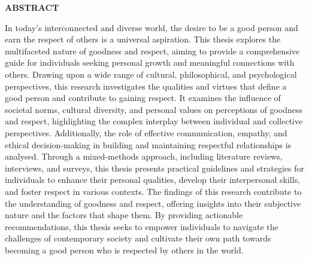 \providecommand\phantomsection{} \phantomsection
\renewcommand{\headrulewidth}{0pt}
\begin{center}
\providecommand\pdfbookmark[3][]{} \pdfbookmark[0]{Abstract}{bm:Abstract}
\vspace*{1in}
\textbf{ABSTRACT}\\[2\baselineskip]
\end{center}


In today's interconnected and diverse world, the desire to be a good person and earn the respect of others is a universal aspiration. This thesis explores the multifaceted nature of goodness and respect, aiming to provide a comprehensive guide for individuals seeking personal growth and meaningful connections with others. Drawing upon a wide range of cultural, philosophical, and psychological perspectives, this research investigates the qualities and virtues that define a good person and contribute to gaining respect. It examines the influence of societal norms, cultural diversity, and personal values on perceptions of goodness and respect, highlighting the complex interplay between individual and collective perspectives. Additionally, the role of effective communication, empathy, and ethical decision-making in building and maintaining respectful relationships is analysed. Through a mixed-methods approach, including literature reviews, interviews, and surveys, this thesis presents practical guidelines and strategies for individuals to enhance their personal qualities, develop their interpersonal skills, and foster respect in various contexts. The findings of this research contribute to the understanding of goodness and respect, offering insights into their subjective nature and the factors that shape them. By providing actionable recommendations, this thesis seeks to empower individuals to navigate the challenges of contemporary society and cultivate their own path towards becoming a good person who is respected by others in the world.


\newpage